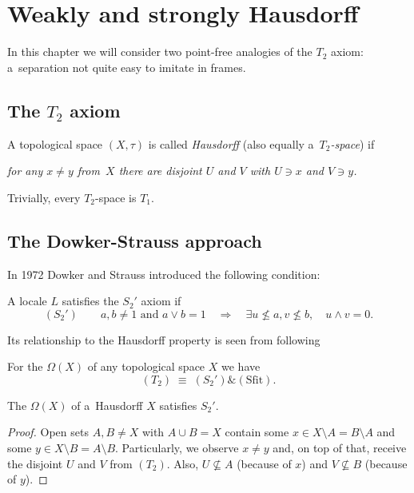 \chapter{Weakly and strongly Hausdorff}

In this chapter we will consider two point-free analogies of the $T_2$ axiom:
a~separation not quite easy to imitate in frames.

\section{The $T_2$ axiom}

\begin{framed}
  \begin{df}[$T_2$]
    A topological space $(X, \tau)$ is called \emph{Hausdorff\/} (also equally
    a~\emph{$T_2$-space\/}) if
    \begin{center} \it
      for any $x \ne y$ from~$X$ there are disjoint $U$ and $V$ with $U\owns x$
      and $V\owns y$.
    \end{center}
  \end{df}
\end{framed}

\begin{rem} \label{T2->T1}
  Trivially, every $T_2$-space is $T_1$.
\end{rem}

\section{The Dowker-Strauss approach}

In 1972 Dowker and Strauss \cite{ds72} introduced the following condition:

\begin{framed}
  \begin{df}
    A locale $L$ satisfies the $S_2'$ axiom if
    \[
      (S_2') \qquad
      a, b \ne 1 \text{ and } a \vee b = 1 \quad \Rightarrow \quad \exists
      u\not\leq a, v\not\leq b, \quad u \wedge v = 0.
    \]
  \end{df}
\end{framed}

Its relationship to the Hausdorff property is seen from following
\begin{thm} \label{thm:T2=S2'+Sfit}
  For the $\Omega(X)$ of any topological space $X$ we have
  \[
    (T_2) \; \equiv \; (S_2') \& (\text{Sfit}).
  \]
\end{thm}

\begin{lem} \label{Haus->S2'}
  The $\Omega(X)$ of a~Hausdorff $X$ satisfies $S_2'$.
\end{lem}
\begin{proof}
  Open sets $A, B \ne X$ with $A \cup B = X$ contain some $x\in X\setminus A =
  B\setminus A$ and some $y\in X\setminus B = A\setminus B$.
  Particularly, we observe $x \ne y$ and, on top of that, receive the disjoint
  $U$ and $V$ from $(T_2)$.
  Also, $U\not\subseteq A$ (because of $x$) and $V\not\subseteq B$ (because of
  $y$).
\end{proof}

